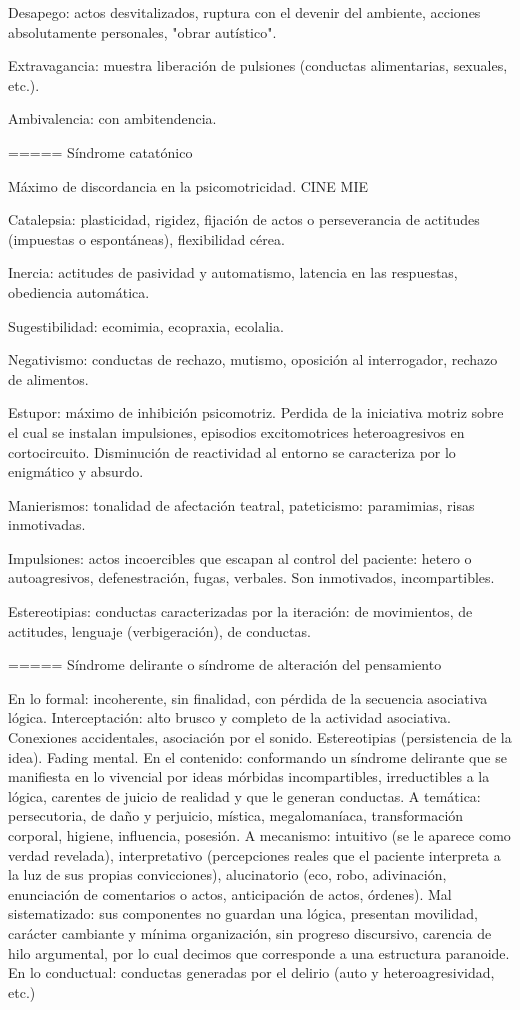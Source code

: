 Desapego: actos desvitalizados, ruptura con el devenir del ambiente, acciones absolutamente personales, "obrar autístico".

Extravagancia: muestra liberación de pulsiones (conductas alimentarias, sexuales, etc.).

Ambivalencia: con ambitendencia.

===== Síndrome catatónico

Máximo de discordancia en la psicomotricidad. CINE MIE

Catalepsia: plasticidad, rigidez, fijación de actos o perseverancia de actitudes (impuestas o espontáneas), flexibilidad cérea.

Inercia: actitudes de pasividad y automatismo, latencia en las respuestas, obediencia automática.

Sugestibilidad: ecomimia, ecopraxia, ecolalia.

Negativismo: conductas de rechazo, mutismo, oposición al interrogador, rechazo de alimentos.

Estupor: máximo de inhibición psicomotriz. Perdida de la iniciativa motriz sobre el cual se instalan impulsiones, episodios excitomotrices heteroagresivos en cortocircuito. Disminución de reactividad al entorno se caracteriza por lo enigmático y absurdo.

Manierismos: tonalidad de afectación teatral, pateticismo: paramimias, risas inmotivadas.

Impulsiones: actos incoercibles que escapan al control del paciente: hetero o autoagresivos, defenestración, fugas, verbales. Son inmotivados, incompartibles.

Estereotipias: conductas caracterizadas por la iteración: de movimientos, de actitudes, lenguaje (verbigeración), de conductas.

===== Síndrome delirante o síndrome de alteración del pensamiento

En lo formal: incoherente, sin finalidad, con pérdida de la secuencia asociativa lógica. Interceptación: alto brusco y completo de la actividad asociativa. Conexiones accidentales, asociación por el sonido. Estereotipias (persistencia de la idea). Fading mental. 
En el contenido: conformando un síndrome delirante que se manifiesta en lo vivencial por ideas mórbidas incompartibles, irreductibles a la lógica, carentes de juicio de realidad y que le generan conductas. 
A temática: persecutoria, de daño y perjuicio, mística, megalomaníaca, transformación corporal, higiene, influencia, posesión. 
A mecanismo: intuitivo (se le aparece como verdad revelada), interpretativo (percepciones reales que el paciente interpreta a la luz de sus propias convicciones), alucinatorio (eco, robo, adivinación, enunciación de comentarios o actos, anticipación de actos, órdenes). Mal sistematizado: sus componentes no guardan una lógica, presentan movilidad, carácter cambiante y mínima organización, sin progreso discursivo, carencia de hilo argumental, por lo cual decimos que corresponde a una estructura paranoide. En lo conductual: conductas generadas por el delirio (auto y heteroagresividad, etc.) 

